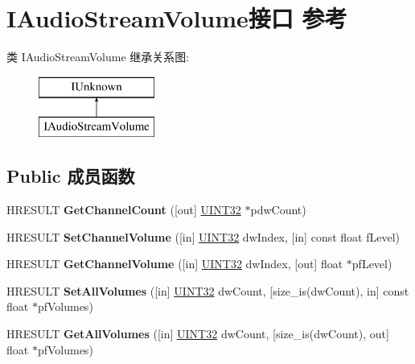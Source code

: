 \hypertarget{interface_i_audio_stream_volume}{}\section{I\+Audio\+Stream\+Volume接口 参考}
\label{interface_i_audio_stream_volume}
类 I\+Audio\+Stream\+Volume 继承关系图\+:\begin{figure}[H]
\begin{center}
\leavevmode
\includegraphics[height=2.000000cm]{interface_i_audio_stream_volume}
\end{center}
\end{figure}
\subsection*{Public 成员函数}
\begin{DoxyCompactItemize}
\item 
\mbox{\label{interface_i_audio_stream_volume_ae33f0e5e9d6123589cfc9cfea5b51898}} 
H\+R\+E\+S\+U\+LT {\bfseries Get\+Channel\+Count} (\mbox{[}out\mbox{]} \hyperlink{_processor_bind_8h_ae1e6edbbc26d6fbc71a90190d0266018}{U\+I\+N\+T32} $\ast$pdw\+Count)
\item 
\mbox{\label{interface_i_audio_stream_volume_a50979e1bd7e5726ea6ed210531f2574f}} 
H\+R\+E\+S\+U\+LT {\bfseries Set\+Channel\+Volume} (\mbox{[}in\mbox{]} \hyperlink{_processor_bind_8h_ae1e6edbbc26d6fbc71a90190d0266018}{U\+I\+N\+T32} dw\+Index, \mbox{[}in\mbox{]} const float f\+Level)
\item 
\mbox{\label{interface_i_audio_stream_volume_ac49e3f0980e01b05cd3450be0c4a336d}} 
H\+R\+E\+S\+U\+LT {\bfseries Get\+Channel\+Volume} (\mbox{[}in\mbox{]} \hyperlink{_processor_bind_8h_ae1e6edbbc26d6fbc71a90190d0266018}{U\+I\+N\+T32} dw\+Index, \mbox{[}out\mbox{]} float $\ast$pf\+Level)
\item 
\mbox{\label{interface_i_audio_stream_volume_a53ad9f9238387a19b22d9a38315c248c}} 
H\+R\+E\+S\+U\+LT {\bfseries Set\+All\+Volumes} (\mbox{[}in\mbox{]} \hyperlink{_processor_bind_8h_ae1e6edbbc26d6fbc71a90190d0266018}{U\+I\+N\+T32} dw\+Count, \mbox{[}size\+\_\+is(dw\+Count), in\mbox{]} const float $\ast$pf\+Volumes)
\item 
\mbox{\label{interface_i_audio_stream_volume_a0d4d8460a4cf8f5c19f8e1cbc27ed1e3}} 
H\+R\+E\+S\+U\+LT {\bfseries Get\+All\+Volumes} (\mbox{[}in\mbox{]} \hyperlink{_processor_bind_8h_ae1e6edbbc26d6fbc71a90190d0266018}{U\+I\+N\+T32} dw\+Count, \mbox{[}size\+\_\+is(dw\+Count), out\mbox{]} float $\ast$pf\+Volumes)
\end{DoxyCompactItemize}

